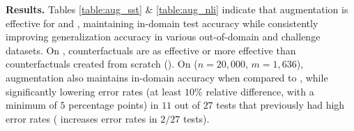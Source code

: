 


\textbf{Results.}
Tables \ref{table:aug_sst} \& \ref{table:aug_nli} indicate that \sysname augmentation is effective for \sst and \nli, maintaining in-domain test accuracy while consistently improving generalization accuracy in various out-of-domain and challenge datasets. On \nli, \sysname counterfactuals are as effective or more effective than counterfactuals created from scratch (\mcad).
On \qqp ($n=20,000$, $m=1,636$), \sysname{} augmentation also maintains in-domain accuracy when compared to \mcomp, while significantly lowering error rates (at least $10\%$ relative difference, with a minimum of $5$ percentage points) in $11$ out of $27$ tests that previously had high error rates (\sysname{} increases error rates in $2/27$ tests).


